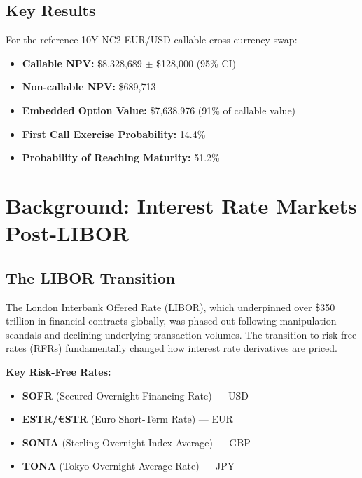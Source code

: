 \documentclass[10pt,a4paper]{article}
\begin{document}
\subsection{Key Results}

For the reference 10Y NC2 EUR/USD callable cross-currency swap:

\begin{itemize}
    \item \textbf{Callable NPV:} \$8,328,689 $\pm$ \$128,000 (95\% CI)
    \item \textbf{Non-callable NPV:} \$689,713
    \item \textbf{Embedded Option Value:} \$7,638,976 (91\% of callable value)
    \item \textbf{First Call Exercise Probability:} 14.4\%
    \item \textbf{Probability of Reaching Maturity:} 51.2\%
\end{itemize}

\newpage

\section{Background: Interest Rate Markets Post-LIBOR}

\subsection{The LIBOR Transition}

The London Interbank Offered Rate (LIBOR), which underpinned over \$350 trillion in financial contracts globally, was phased out following manipulation scandals and declining underlying transaction volumes. The transition to risk-free rates (RFRs) fundamentally changed how interest rate derivatives are priced.

\textbf{Key Risk-Free Rates:}
\begin{itemize}
    \item \textbf{SOFR} (Secured Overnight Financing Rate) --- USD
    \item \textbf{ESTR/€STR} (Euro Short-Term Rate) --- EUR
    \item \textbf{SONIA} (Sterling Overnight Index Average) --- GBP
    \item \textbf{TONA} (Tokyo Overnight Average Rate) --- JPY
\end{itemize}
\end{document}
